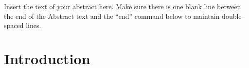 \documentclass[12pt,letterpaper]{lsuetd}
\begin{document}
\singlespacing
\tableofcontents
\pagebreak

\renewcommand\@pnumwidth{1.55em}
\renewcommand\@tocrmarg{8.55em}
\listoftables
\pagebreak
\listoffigures
\pagebreak


\renewenvironment{abstract}{{\hspace{-2.2em} \huge \textbf{\abstractname}} \par}{\pagebreak}
\begin{abstract}
\vspace{0.55ex}
\doublespacing
Insert the text of your abstract here.  Make sure there is one blank line between the end of the Abstract text and the ``end'' command below to maintain double--spaced lines.

\end{abstract}

\singlespacing
\setlength{\textfloatsep}{12pt plus 2pt minus 2pt}
\setlength{\intextsep}{6pt plus 2pt minus 2pt}
\chapter{Introduction}
\doublespacing

\pagebreak
\singlespacing
\end{document}
